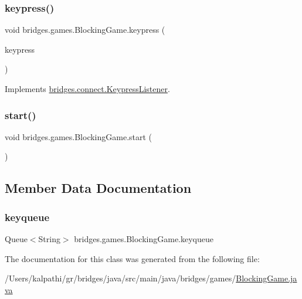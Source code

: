 \subsubsection{\texorpdfstring{keypress()}{keypress()}}
{\footnotesize\ttfamily void bridges.\+games.\+Blocking\+Game.\+keypress (\begin{DoxyParamCaption}\item[{J\+S\+O\+N\+Object}]{keypress }\end{DoxyParamCaption})}



Implements \mbox{\hyperlink{interfacebridges_1_1connect_1_1_keypress_listener_af713d94f36bce842f39ce0aea4db8da6}{bridges.\+connect.\+Keypress\+Listener}}.

\mbox{\label{classbridges_1_1games_1_1_blocking_game_a00f9ad93393ba18407940f24aaddfa21}} 
\subsubsection{\texorpdfstring{start()}{start()}}
{\footnotesize\ttfamily void bridges.\+games.\+Blocking\+Game.\+start (\begin{DoxyParamCaption}{ }\end{DoxyParamCaption})}



\subsection{Member Data Documentation}
\mbox{\label{classbridges_1_1games_1_1_blocking_game_a7a8057fd0e008879f89c86d929cc92e6}} 
\subsubsection{\texorpdfstring{keyqueue}{keyqueue}}
{\footnotesize\ttfamily Queue$<$String$>$ bridges.\+games.\+Blocking\+Game.\+keyqueue\hspace{0.3cm}{\ttfamily [protected]}}



The documentation for this class was generated from the following file\+:\begin{DoxyCompactItemize}
\item 
/\+Users/kalpathi/gr/bridges/java/src/main/java/bridges/games/\mbox{\hyperlink{_blocking_game_8java}{Blocking\+Game.\+java}}\end{DoxyCompactItemize}
